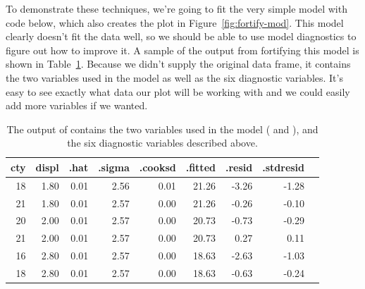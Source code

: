 {%

To demonstrate these techniques, we're going to fit the very simple model with code below, which also creates the plot in Figure~\ref{fig:fortify-mod}. This model clearly doesn't fit the data well, so we should be able to use model diagnostics to figure out how to improve it. A sample of the output from fortifying this model is shown in Table~\ref{tbl:fortify-out}. Because we didn't supply the original data frame, it contains the two variables used in the model as well as the six diagnostic variables. It's easy to see exactly what data our plot will be working with and we could easily add more variables if we wanted.

% 



\begin{table}[ht]
  \centering
  \begin{tabular}{rrrrrrrrr}
    \toprule
    cty & displ & .hat & .sigma & .cooksd & .fitted & .resid & .stdresid \\
    \midrule
    18 & 1.80 & 0.01 & 2.56 & 0.01 & 21.26 & -3.26 & -1.28 \\
    21 & 1.80 & 0.01 & 2.57 & 0.00 & 21.26 & -0.26 & -0.10 \\
    20 & 2.00 & 0.01 & 2.57 & 0.00 & 20.73 & -0.73 & -0.29 \\
    21 & 2.00 & 0.01 & 2.57 & 0.00 & 20.73 & 0.27 & 0.11 \\
    16 & 2.80 & 0.01 & 2.57 & 0.00 & 18.63 & -2.63 & -1.03 \\
    18 & 2.80 & 0.01 & 2.57 & 0.00 & 18.63 & -0.63 & -0.24 \\
    \bottomrule
  \end{tabular}
  \caption{The output of  contains the two variables used in the model ( and ), and the six diagnostic variables described above.}
  \label{tbl:fortify-out}
\end{table}


}
